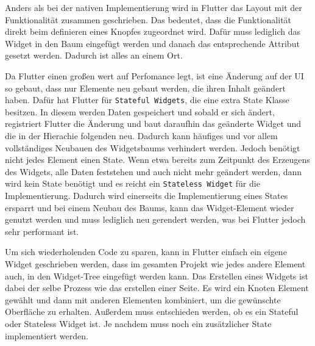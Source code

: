 
Anders als bei der nativen Implementierung wird in Flutter das Layout mit der Funktionalität zusammen geschrieben. Das bedeutet, dass die Funktionalität direkt beim definieren eines Knopfes zugeordnet wird. Dafür muss lediglich das Widget in den Baum eingefügt werden und danach das entsprechende Attribut gesetzt werden. Dadurch ist alles an einem Ort.

Da Flutter einen großen wert auf Perfomance legt, ist eine Änderung auf der \ac{UI} so gebaut, dass nur Elemente neu gebaut werden, die ihren Inhalt geändert haben. Dafür hat Flutter für \verb|Stateful Widgets|, die eine extra State Klasse besitzen. In diesem werden Daten gespeichert und sobald er sich ändert, registriert Flutter die Änderung und baut daraufhin das geänderte Widget und die in der Hierachie folgenden neu\cite{9623025}. Dadurch kann häufiges und vor allem vollständiges Neubauen des Widgetsbaums verhindert werden. Jedoch benötigt nicht jedes Element einen State. Wenn etwa bereits zum Zeitpunkt des Erzeugens des Widgets, alle Daten feststehen und auch nicht mehr geändert werden, dann wird kein State benötigt und es reicht ein \verb|Stateless Widget| für die Implementierung\cite[Kapitel~4]{Flutter_Recipes}. Dadurch wird einerseits die Implementierung eines States ersparrt und bei einem Neubau des Baums, kann das Widget-Element wieder genutzt werden und muss lediglich neu gerendert werden, was bei Flutter jedoch sehr performant ist.

Um sich wiederholenden Code zu sparen, kann in Flutter einfach ein eigene Widget geschrieben werden, dass im gesamten Projekt wie jedes andere Element auch, in den Widget-Tree eingefügt werden kann. Das Erstellen eines Widgets ist dabei der selbe Prozess wie das erstellen einer Seite. Es wird ein Knoten Element gewählt und dann mit anderen Elementen kombiniert, um die gewünschte Oberfläche zu erhalten. Außerdem muss entschieden werden, ob es ein Stateful oder Stateless Widget ist. Je nachdem muss noch ein zusätzlicher State implementiert werden.


